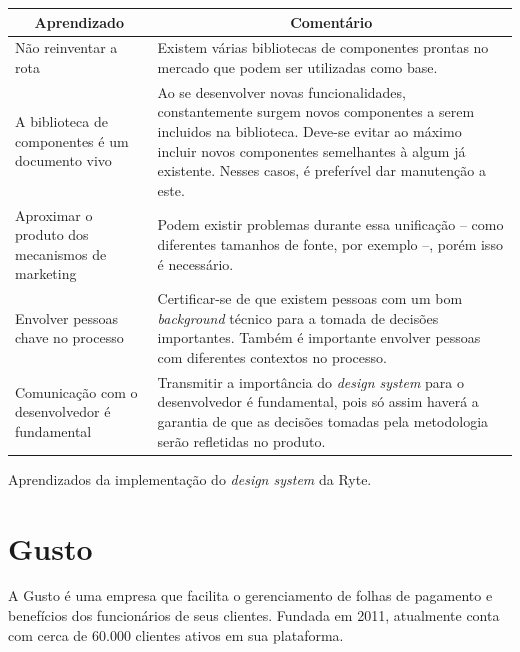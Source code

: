 \begin{quadro}
  \centering
  \begin{tabular}{|m{4cm}|m{10cm}|} \hline
    
    \multicolumn{1}{|c|}{\bfseries Aprendizado} & \multicolumn{1}{c|}{\bfseries Comentário} \\\hline
    
     Não reinventar a rota & Existem várias bibliotecas de componentes prontas no mercado que podem ser utilizadas como base. \\\hline
     
     A biblioteca de componentes é um documento vivo & Ao se desenvolver novas funcionalidades, constantemente surgem novos componentes a serem incluidos na biblioteca. Deve-se evitar ao máximo incluir novos componentes semelhantes à algum já existente. Nesses casos, é preferível dar manutenção a este. \\\hline
     
     Aproximar o produto dos mecanismos de marketing & Podem existir problemas durante essa unificação -- como diferentes tamanhos de fonte, por exemplo --, porém isso é necessário. \\\hline
     
     Envolver pessoas chave no processo & Certificar-se de que existem pessoas com um bom \textit{background} técnico para a tomada de decisões importantes. Também é importante envolver pessoas com diferentes contextos no processo. \\\hline
     
     Comunicação com o desenvolvedor é fundamental & Transmitir a importância do \textit{design system} para o desenvolvedor é fundamental, pois só assim haverá a garantia de que as decisões tomadas pela metodologia serão refletidas no produto. \\\hline
      
  \end{tabular}
  \caption{Aprendizados da implementação do \textit{design system} da Ryte.}
  \label{table:ryteLessonsLearned}
\end{quadro}

\section{Gusto}
\label{sec:gusto}

A Gusto é uma empresa que facilita o gerenciamento de folhas de pagamento e benefícios dos funcionários de seus clientes. Fundada em 2011, atualmente conta com cerca de 60.000 clientes ativos em sua plataforma.

